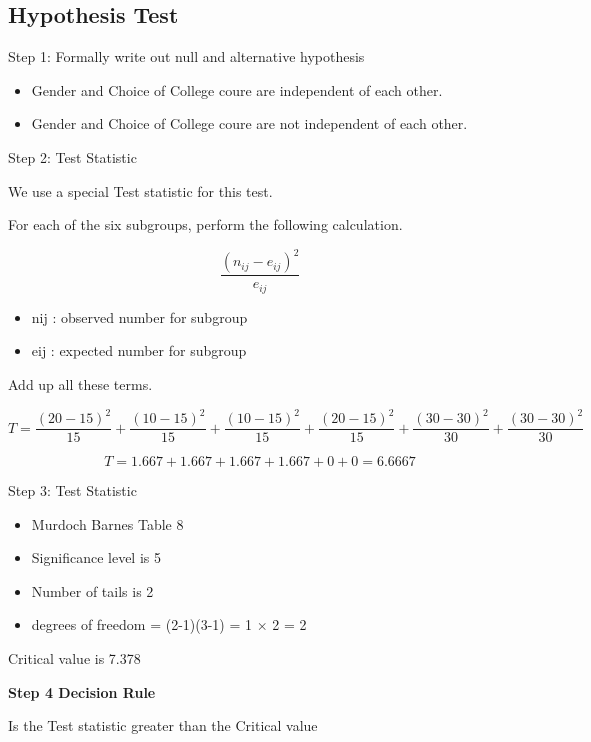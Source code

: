 


\subsection{Hypothesis Test}

Step 1:  Formally write out null and alternative hypothesis

\begin{itemize}
	\item Gender and Choice of College coure are independent of each other.
	
	\item Gender and Choice of College coure are not independent of each other.
\end{itemize}

Step 2: Test Statistic

We use a special Test statistic for this test.

For each of the six subgroups, perform the following calculation.

\[\frac{(n_{ij}-e_{ij})^2}{e_{ij}}\]

\begin{itemize}
	\item nij : observed number for subgroup
	\item eij : expected number for subgroup
\end{itemize}


Add up all these terms.

\[T=\frac{(20-15)^2 }{15} + \frac{(10-15)^2 }{15} + \frac{(10-15)^2 }{15} + \frac{(20-15)^2 }{15} + \frac{(30-30)^2 }{30} + \frac{(30-30)^2 }{30}\]

\[
T= 1.667 + 1.667 +1.667 +1.667 +0 +0 = 6.6667 
\]



Step 3: Test Statistic

\begin{itemize}
	\item Murdoch Barnes Table 8
	\item Significance level is 5%
	\item Number of tails is 2
	\item degrees of freedom = (2-1)(3-1) = 1 $\times$ 2 = 2
\end{itemize}



Critical value is 7.378

\textbf{Step 4 Decision Rule}

Is the Test statistic greater than the Critical value

